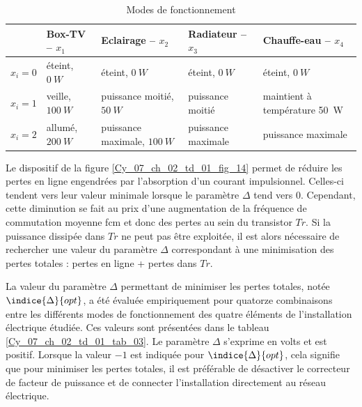\begin{table}[!h]
\centering
\begin{tabular}{cp{3cm}p{3.5cm}p{3.5cm}p{3.5cm}}
\hline
& Box-TV  -- $x_1$ & Eclairage -- $x_2$ & Radiateur -- $x_3$ & Chauffe-eau -- $x_4$  \\
\hline
$x_i = 0$ & éteint, $\SI{0}{W}$	& éteint, $\SI{0}{W}$	& éteint, $\SI{0}{W}$	& éteint, $\SI{0}{W}$ \\
$x_i = 1$ & veille, $\SI{100}{W}$	& puissance moitié, $\SI{50}{W}$	& puissance moitié & maintient à température \SI{50}{W}	\\
$x_i = 2$ & allumé, $\SI{200}{W}$	& puissance maximale, $\SI{100}{W}$	& puissance maximale & puissance maximale \\
\hline
\end{tabular}
\caption{Modes de fonctionnement \label{Cy_07_ch_02_td_01_tab_02}}
\end{table}


Le dispositif de la figure \ref{Cy_07_ch_02_td_01_fig_14} permet de réduire les pertes
en ligne engendrées par l’absorption d’un courant impulsionnel. Celles-ci tendent vers leur
valeur minimale lorsque le paramètre $\Delta$ tend vers 0. Cependant, cette diminution se fait au
prix d’une augmentation de la fréquence de commutation moyenne fcm et donc des pertes
au sein du transistor $Tr$. %
Si la puissance dissipée dans $Tr$ ne peut pas être
exploitée, il est alors nécessaire de rechercher une valeur du paramètre $\Delta$ correspondant à
une minimisation des pertes totales : pertes en ligne + pertes dans $Tr$.

La valeur du paramètre $\Delta$ permettant de minimiser les pertes totales, notée $\indice{\Delta}{opt}$, a été évaluée empiriquement pour quatorze combinaisons entre les différents modes de fonctionnement
des quatre éléments de l’installation électrique étudiée. Ces valeurs sont présentées dans le
tableau \ref{Cy_07_ch_02_td_01_tab_03}. Le paramètre $\Delta$ s’exprime en volts et est positif. Lorsque la valeur $-1$ est indiquée
pour $\indice{\Delta}{opt}$, cela signifie que pour minimiser les pertes totales, il est préférable de désactiver
le correcteur de facteur de puissance et de connecter l’installation directement au réseau
électrique.

